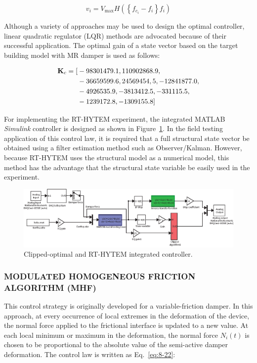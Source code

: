 \begin{equation}\label{eq:8-21}
v_{i} = V_{\text{max}}H\left(\left\{f_{c_{i}}-f_{i}\right\}f_{i}\right)
\end{equation}

Although a variety of approaches may be used to design the optimal controller, linear quadratic regulator (LQR) methods are advocated because of their successful application. The optimal gain of a state vector based on the target building model with MR damper is used as follows:

\begin{align*}
\mathbf{K}_{c} = [&-98301479.1,110902868.9,\\
&-36659599.6,24569454,5, -12841877.0,\\
&-4926535.9, -3813412.5, -331115.5,\\
&-1239172.8, -1309155.8]
\end{align*}

For implementing the RT-HYTEM experiment, the integrated MATLAB \textit{Simulink} controller is designed as shown in Figure~\ref{fig:8-14}. In the field testing application of this control law, it is required that a full structural state vector be obtained using a filter estimation method such as Observer/Kalman. However, because RT-HYTEM uses the structural model as a numerical model, this method has the advantage that the structural state variable be easily used in the experiment.

\begin{figure}[H]
\centering
\includegraphics[width=1\textwidth] {figure/8-14.eps}
\caption{Clipped-optimal and RT-HYTEM integrated controller.}
\label{fig:8-14}
\end{figure}

\subsubsection{MODULATED HOMOGENEOUS FRICTION ALGORITHM (MHF)}

This control strategy is originally developed for a variable-friction damper. In this approach, at every occurrence of local extremes in the deformation of the device, the normal force applied to the frictional interface is updated to a new value. At each local minimum or maximum in the deformation, the normal force $N_{i}(t)$ is chosen to be proportional to the absolute value of the semi-active damper deformation. The control law is written as Eq.~\eqref{eq:8-22}\citep{inaudi1997modulated}:

